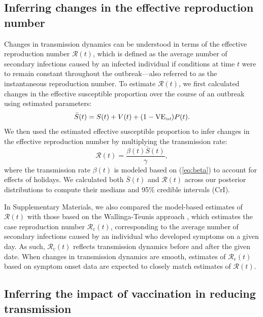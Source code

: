 \documentclass[12pt]{article}
\newcommand{\eref}[1]{(\ref{eq:#1})}
\begin{document}
\subsection{Inferring changes in the effective reproduction number}

Changes in transmission dynamics can be understood in terms of the effective reproduction number $\mathcal{R}(t)$, which is defined as the average number of secondary infections caused by an infected individual if conditions at time $t$ were to remain constant throughout the outbreak---also referred to as the instantaneous reproduction number. 
To estimate $\mathcal{R}(t)$, we first calculated changes in the effective susceptible proportion over the course of an outbreak using estimated parameters: 
\begin{equation}
\bar{S}(t) = S(t) + V(t) + (1-\mathrm{VE}_{\textrm{\tiny{inf}}}) P(t).
\end{equation}
We then used the estimated effective susceptible proportion to infer changes in the effective reproduction number by multiplying the transmission rate:
\begin{equation}
\mathcal R(t) = \frac{\beta(t) \bar{S}(t)}{\gamma},
\end{equation}
where the transmission rate $\beta(t)$ is modeled based on \eref{beta} to account for effects of holidays.
We calculated both $\bar{S}(t)$ and $\mathcal R(t)$ across our posterior distributions to compute their medians and 95\% credible intervals (CrI).

In Supplementary Materials, we also compared the model-based estimates of $\mathcal R(t)$ with those based on the Wallinga-Teunis approach \citep{wallinga2004different}, which estimates the case reproduction number $\mathcal{R}_{\mathrm c}(t)$, corresponding to the average number of secondary infections caused by an individual who developed symptoms on a given day. As such, $\mathcal{R}_{\mathrm c}(t)$ reflects transmission dynamics before and after the given date.
When changes in transmission dynamics are smooth, estimates of $\mathcal{R}_{\mathrm c}(t)$ based on symptom onset data are expected to closely match estimates of $\mathcal R(t)$.

\subsection{Inferring the impact of vaccination in reducing transmission}
\end{document}
